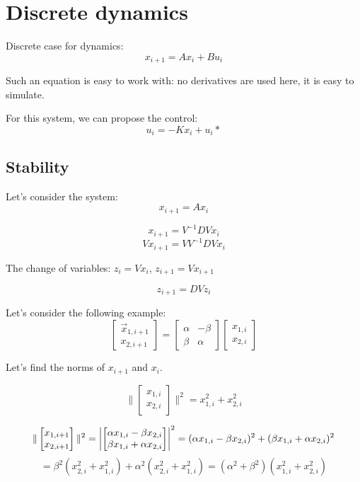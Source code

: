 \section{Discrete dynamics}

Discrete case for dynamics:
\[x_{i+1} = Ax_i +  Bu_i\]

Such an equation is easy to work with: no derivatives are used here, it is easy to simulate. 

For this system, we can propose the control: \[u_i = -Kx_i + u_i*\]
\subsection{Stability}

Let's consider the system:
\[x_{i+1} = A x_i\]

\[x_{i+1} = V^{-1}DV x_i\]
\[V x_{i+1} = V V^{-1}DV x_i\]

The change of variables:
$z_{i} = V x_{i}$, $z_{i+1} = V x_{i+1}$

\[z_{i+1} = DV z_i\]

Let's consider the following example:
\[
\begin{bmatrix}
\vec{x}_{1,i+1} \\
x_{2, i+1}
\end{bmatrix}
=
\begin{bmatrix}
\alpha & -\beta \\
\beta & \alpha
\end{bmatrix}
\begin{bmatrix}
x_{1, i} \\
x_{2, i}
\end{bmatrix}
\]

Let's find the norms of \(x_{i+1}\) and \(x_i\).

\[
\| \begin{bmatrix}
x_{1, i} \\
x_{2, i}
\end{bmatrix}
\|^2 = x_{1, i}^2 + x_{2, i}^2
\]

\[
\| \begin{bmatrix}
x_{1, i+1} \\
x_{2, i+1}
\end{bmatrix}
\|^2 = \left| \begin{bmatrix}
\alpha x_{1, i} - \beta x_{2, i} \\
\beta x_{1, i} + \alpha x_{2, i}
\end{bmatrix} \right|^2
= (\alpha x_{1, i} - \beta x_{2, i})^2 + (\beta x_{1, i} + \alpha x_{2, i})^2 \\\]
\[= \beta^2 (x_{2,i}^2 + x_{1,i}^2) + \alpha^2 (x_{2,i}^2 + x_{1,i}^2)
= (\alpha^2 + \beta^2) (x_{1, i}^2 + x_{2, i}^2)
\]



